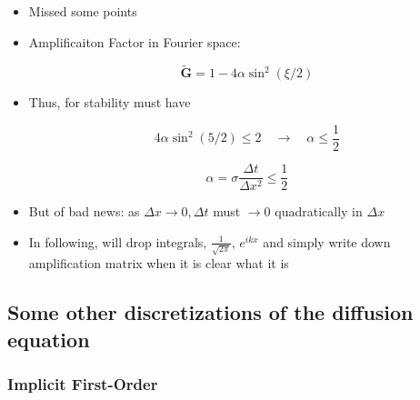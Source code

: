 \begin{itemize}
    \item Missed some points

    \item Amplificaiton Factor in Fourier space:

    \begin{equation}
        \tilde{\mathbf{G}} = 1-4 \alpha \sin^2(\xi/2)
    \end{equation}

    \item Thus, for stability must have

    \[ 4 \alpha \sin^2 (5/2) \le 2 \quad \rightarrow \quad \alpha \le \frac{1}{2}\]

    \begin{equation}
        \alpha = \sigma \frac{\Delta t}{\Delta x^2} \le \frac{1}{2}
    \end{equation}

    \item But of bad news: as $\Delta x \rightarrow 0 , \Delta t$ must $\rightarrow 0$ quadratically in $\Delta x$
    \item In following, will drop integrals, $\frac{1}{\sqrt{2\pi}}$, $e^{ikx}$ and simply write down amplification matrix when it is clear what it is
\end{itemize}

\subsection{Some other discretizations of the diffusion equation}

\subsubsection{Implicit First-Order}

